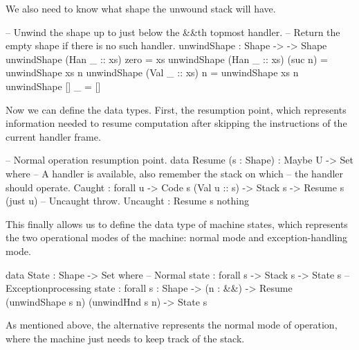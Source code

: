 \noindent We also need to know what shape the unwound stack will have.
\label{sec:ham-unwindShape}\begin{code}
  -- Unwind the shape up to just below the &&\-th top\-most handler.
  -- Return the empty shape if there is no such handler.
  unwindShape : Shape -> \bN -> Shape
  unwindShape (Han _ :: xs) zero    = xs
  unwindShape (Han _ :: xs) (suc n) = unwindShape xs n
  unwindShape (Val _ :: xs) n       = unwindShape xs n
  unwindShape []           _       = []
\end{code}

\noindent Now we can define the data types. First, the resumption point, which
represents information needed to resume computation after skipping the instructions
of the current handler frame.
\begin{code}
  -- Normal operation resumption point.
  data Resume (s : Shape) : Maybe U -> Set where
    -- A handler is available, also remember the stack on which
    -- the handler should operate.
    Caught : forall {u} -> Code s (Val u :: s) -> Stack s -> Resume s (just u)
    -- Uncaught throw.
    Uncaught : Resume s nothing
\end{code}

\noindent This finally allows us to define the data type of machine states, which represents
the two operational modes of the machine: normal mode and exception-handling mode.
\begin{code}
  data State : Shape -> Set where
  	-- Normal state
  	\tick[_] : forall {s} -> Stack s -> State s
  	-- Exception\-processing state
  	\x[_,_] : forall {s : Shape}
  	  -> (n : \bN&\!&)
  	  -> Resume (unwindShape s n) (unwindHnd s n)
  	  -> State s
\end{code}

\noindent As mentioned above, the alternative \ident{\tick[\_]} represents the normal mode
of operation, where the machine just needs to keep track of the stack.

